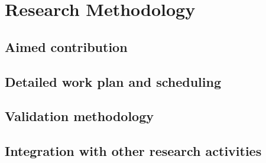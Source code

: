 \chapter{Research Methodology}
\label{cha:methodology}

\section{Aimed contribution}%
\label{sec:aimed_contribution}

\section{Detailed work plan and scheduling}%
\label{sec:detailed_work_plan_and_scheduling}

\section{Validation methodology}%
\label{sec:validation_methodology}

\section{Integration with other research activities}%
\label{sec:integration_with_other_research_activities}







